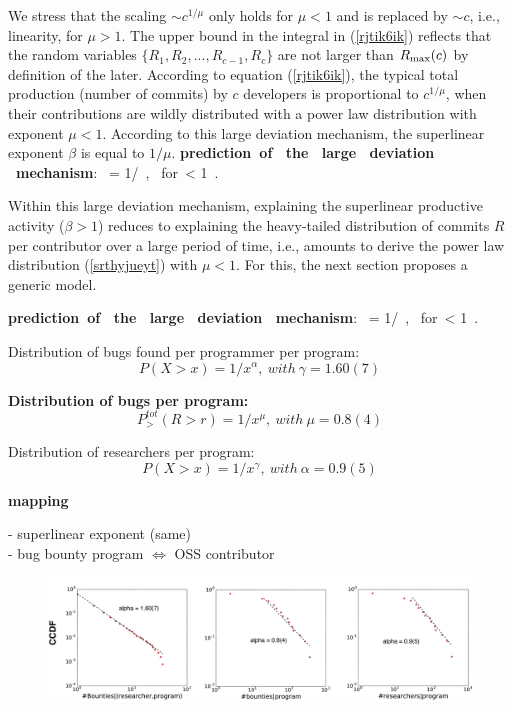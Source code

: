 We stress that the scaling $\sim c^{1/\mu}$ only holds for $\mu <1$ and is replaced
by $\sim c$, i.e., linearity, for $\mu > 1$.
The upper bound in the integral in (\ref{rjtik6ik}) reflects that
the random variables $\{R_1, R_2, ..., R_{c-1}, R_c\}$ are not larger than $R_{\rm max}(c)$
by definition of the later. According to equation (\ref{rjtik6ik}), the typical
total production (number of commits) by $c$ developers
is proportional to $c^{1/\mu}$, when their contributions are wildly distributed
with a power law distribution with exponent $\mu <1$. According to this large
deviation mechanism, the superlinear exponent $\beta$ is equal to $1/\mu$.
\be
{\rm \bf prediction~of ~the~ large~ deviation ~mechanism}: ~\beta = 1/\mu~, ~{\rm for}~\mu < 1~.
\label{eyyn}
\ee

Within this large deviation mechanism, explaining the superlinear productive activity ($\beta>1$) 
reduces to explaining the heavy-tailed distribution of commits $R$ per contributor over a large period of time,
i.e., amounts to derive the power law distribution (\ref{srthyjueyt}) with $\mu <1$. For this, the next section
proposes a generic model.


\be
{\rm \bf prediction~of ~the~ large~ deviation ~mechanism}: ~\beta = 1/\mu~, ~{\rm for}~\mu < 1~.
\label{eyyn}
\ee


Distribution of bugs found per programmer per program:
\begin{equation}
P(X > x) = 1/x^{\alpha},~with~\gamma = 1.60(7) 
\end{equation}

{\bf Distribution of bugs per program:}
\begin{equation}
P^{tot}_{>}(R > r) = 1/x^{\mu},~with~\mu = 0.8(4) 
\end{equation}

Distribution of researchers per program:
\begin{equation}
P(X > x) = 1/x^{\gamma},~with~\alpha = 0.9(5) 
\end{equation}



{\bf mapping}

- superlinear exponent (same)\\
- bug bounty program  $\Leftrightarrow$ OSS contributor \\










\begin{figure}
\begin{center}
\includegraphics[width=16cm]{figures/ccdfs.png}
\caption{ }
\label{ }
\end{center}
\end{figure}